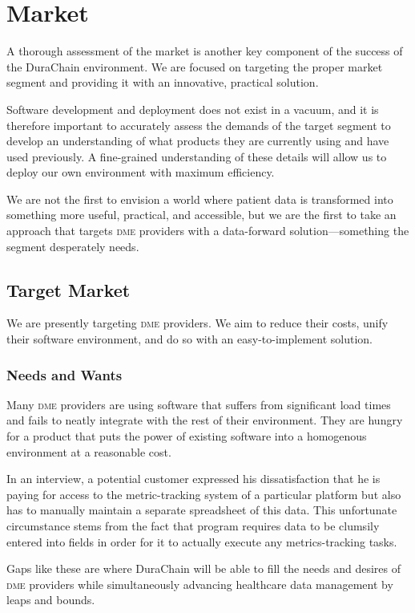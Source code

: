\section{Market}
A thorough assessment of the market is another key component of the success of the DuraChain environment. We are focused on targeting the proper market segment and providing it with an innovative, practical solution.%

Software development and deployment does not exist in a vacuum, and it is therefore important to accurately assess the demands of the target segment to develop an understanding of what products they are currently using and have used previously. A fine-grained understanding of these details will allow us to deploy our own environment with maximum efficiency.%

We are not the first to envision a world where patient data is transformed into something more useful, practical, and accessible, but we are the first to take an approach that targets \textsc{dme} providers with a data-forward solution---something the segment desperately needs.%

\subsection{Target Market}
We are presently targeting \textsc{dme} providers. We aim to reduce their costs, unify their software environment, and do so with an easy-to-implement solution.%

  \subsubsection{Needs and Wants}
  Many \textsc{dme} providers are using software that suffers from significant load times and fails to neatly integrate with the rest of their environment. They are hungry for a product that puts the power of existing software into a homogenous environment at a reasonable cost.%

  In an interview, a potential customer expressed his dissatisfaction that he is paying for access to the metric-tracking system of a particular platform but also has to manually maintain a separate spreadsheet of this data. This unfortunate circumstance stems from the fact that program requires data to be clumsily entered into fields in order for it to actually execute any metrics-tracking tasks.%

  Gaps like these are where DuraChain will be able to fill the needs and desires of \textsc{dme} providers while simultaneously advancing healthcare data management by leaps and bounds.%

